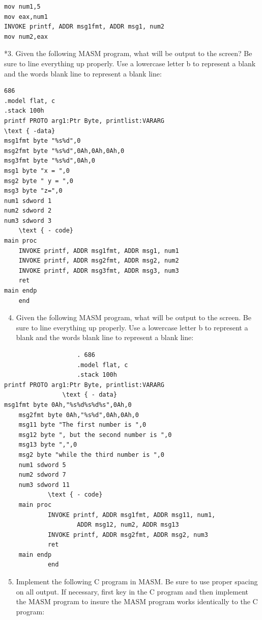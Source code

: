 \documentclass[10pt]{book}
\begin{document}
\begin{verbatim}
mov num1,5
mov eax,num1
INVOKE printf, ADDR msg1fmt, ADDR msg1, num2
mov num2,eax
\end{verbatim}

*3. Given the following MASM program, what will be output to the screen? Be sure to line everything up properly. Use a lowercase letter b to represent a blank and the words blank line to represent a blank line:

\begin{verbatim}
686
.model flat, c
.stack 100h
printf PROTO arg1:Ptr Byte, printlist:VARARG
\text { -data}
msg1fmt byte "%s%d",0
msg2fmt byte "%s%d",0Ah,0Ah,0Ah,0
msg3fmt byte "%s%d",0Ah,0
msg1 byte "x = ",0
msg2 byte " y = ",0
msg3 byte "z=",0
num1 sdword 1
num2 sdword 2
num3 sdword 3
    \text { - code}
main proc
    INVOKE printf, ADDR msg1fmt, ADDR msg1, num1
    INVOKE printf, ADDR msg2fmt, ADDR msg2, num2
    INVOKE printf, ADDR msg3fmt, ADDR msg3, num3
    ret
main endp
    end
\end{verbatim}

\begin{enumerate}
  \setcounter{enumi}{3}
  \item Given the following MASM program, what will be output to the screen. Be sure to line everything up properly. Use a lowercase letter b to represent a blank and the words blank line to represent a blank line:
\end{enumerate}

\begin{verbatim}
                    . 686
                    .model flat, c
                    .stack 100h
printf PROTO arg1:Ptr Byte, printlist:VARARG
                \text { - data}
msg1fmt byte 0Ah,"%s%d%s%d%s",0Ah,0
    msg2fmt byte 0Ah,"%s%d",0Ah,0Ah,0
    msg11 byte "The first number is ",0
    msg12 byte ", but the second number is ",0
    msg13 byte ",",0
    msg2 byte "while the third number is ",0
    num1 sdword 5
    num2 sdword 7
    num3 sdword 11
            \text { - code}
    main proc
            INVOKE printf, ADDR msg1fmt, ADDR msg11, num1,
                    ADDR msg12, num2, ADDR msg13
            INVOKE printf, ADDR msg2fmt, ADDR msg2, num3
            ret
    main endp
            end
\end{verbatim}

\begin{enumerate}
  \setcounter{enumi}{4}
  \item Implement the following C program in MASM. Be sure to use proper spacing on all output. If necessary, first key in the C program and then implement the MASM program to insure the MASM program works identically to the C program:
\end{enumerate}
\end{document}
